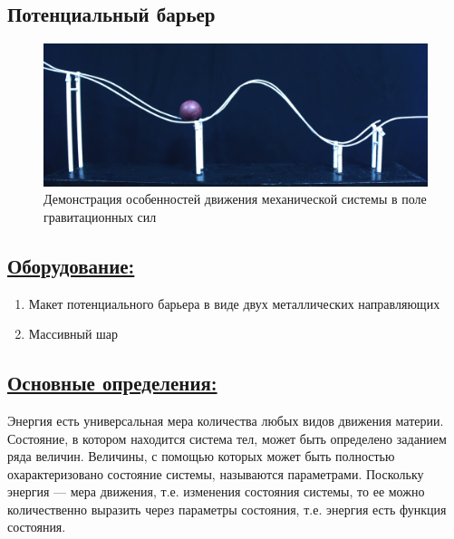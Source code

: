 \documentclass[14pt,a4paper,oneside]{extarticle}	%
\begin{document}
	

	\begin{center}
		\subsection*{Потенциальный барьер}
	\end{center}
		

\begin{figure}[H] 	
	\centering 	
	\includegraphics[width=0.9\linewidth]{barrier-1.png}
	\caption{Демонстрация особенностей движения механической системы в поле гравитационных сил}
	\label{barrier-1}
\end{figure}
	
	\subsection*{\underline{Оборудование:}}

		\begin{enumerate}
			\item Макет потенциального барьера в виде двух металлических направляющих
			\item Массивный шар
		\end{enumerate}
	
		\subsection*{\underline{Основные определения:}}
		
		Энергия есть универсальная мера количества любых видов движения материи.
		Состояние, в котором находится система тел, может быть определено заданием ряда величин.
		Величины, с помощью которых может быть полностью охарактеризовано состояние системы, называются параметрами.
		Поскольку энергия — мера движения, т.е. изменения состояния системы, то ее можно количественно выразить через параметры состояния, т.е. энергия есть функция состояния.
		
\end{document}
